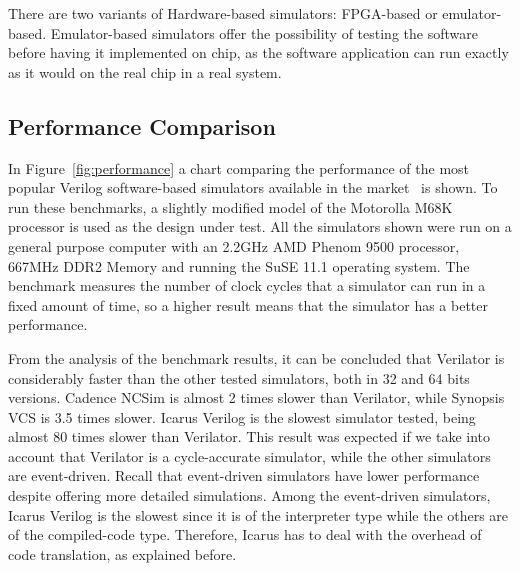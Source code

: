 \documentclass[conference]{IEEEtran}
\begin{document}
There are two variants of Hardware-based simulators: \ac{FPGA}-based or
emulator-based. Emulator-based simulators offer the possibility of testing the software 
before having it implemented on chip, as the software application can run exactly as it
would on the real chip in a real system.

\subsection{Performance Comparison}
\label{section:performance}

In Figure~\ref{fig:performance} a chart comparing the performance of the most
popular Verilog software-based simulators available in the 
market~\cite{verilator:benchmarks} is shown. To run these benchmarks, a slightly modified 
model of the Motorolla M68K processor is used as the design under test. All the 
simulators shown were run on a general purpose computer with an 2.2GHz AMD Phenom 9500 
processor, 667MHz DDR2 Memory and running the SuSE 11.1 operating system. The benchmark
measures the number of clock cycles that a simulator can run in a fixed amount
of time, so a higher result means that the simulator has a better performance.

From the analysis of the benchmark results, it can be concluded that Verilator
is considerably faster than the other tested simulators, both in 32 and 64 bits
versions. Cadence NCSim is almost 2 times slower than Verilator, while Synopsis
VCS is 3.5 times slower. Icarus Verilog is the slowest simulator tested, being
almost 80 times slower than Verilator. This result was expected if we take into
account that Verilator is a cycle-accurate simulator, while the other simulators
are event-driven. Recall that event-driven simulators have lower performance
despite offering more detailed simulations. Among the event-driven simulators,
Icarus Verilog is the slowest since it is of the interpreter type while the
others are of the compiled-code type. Therefore, Icarus has to deal with the
overhead of code translation, as explained before.
\end{document}
